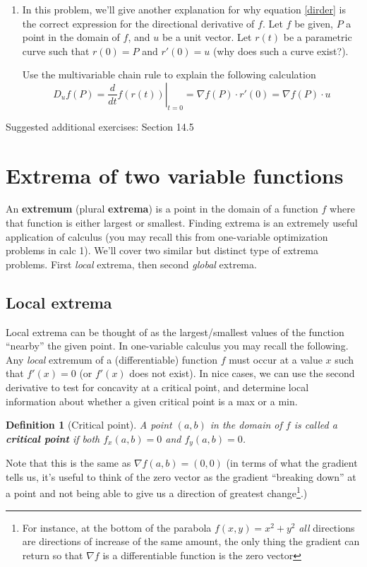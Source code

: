 \documentclass[12pt]{article}
\numberwithin{equation}{subsection}
\numberwithin{figure}{subsection}
\newtheorem{defn}[subsection]{Definition}
\theoremstyle{note}
\begin{document}
{\begin{enumerate}[label=\arabic*.]
\item In this problem, we'll give another explanation for  why equation \eqref{dirder} is the correct expression for the directional derivative of $f$. Let $f$ be given, $P$ a point in the domain of $f$, and $u$ be a unit vector. Let $r(t)$ be a parametric curve such that $r(0)=P$ and $r'(0)=u$ (why does such a curve exist?). 

Use the multivariable chain rule to explain the following calculation \[ D_uf(P)=\left. \dfrac{d}{dt} f(r(t)) \right|_{t=0} = \nabla f(P)  \cdot r'(0)=\nabla f(P)\cdot u \]
\end{enumerate}

Suggested additional exercises: Section 14.5 





\section{Extrema of two variable functions}

An \textbf{extremum} (plural \textbf{extrema}) is a point in the domain of a function $f$ where that function is either largest or smallest. Finding extrema is an extremely useful application of calculus (you may recall this from one-variable optimization problems in calc 1). We'll cover two similar but distinct type of extrema problems. First \textit{local} extrema, then second \textit{global} extrema. 

\subsection{Local extrema}
Local extrema can be thought of as the largest/smallest values of the function ``nearby'' the given point. In one-variable calculus you may recall the following. Any \textit{local} extremum of a (differentiable) function $f$ must occur at a value $x$ such that $f'(x)=0$ (or $f'(x)$ does not exist). In nice cases, we can use the second derivative to test for concavity at a critical point, and determine local information about whether a given critical point is a max or a min.

\begin{defn}[Critical point] A point $(a,b)$ in the domain of $f$ is called a \textbf{critical point} if both $f_x(a,b)=0$ and $f_y(a,b)=0$. 
\end{defn}

Note that this is the same as $\nabla f(a,b)=(0,0)$ (in terms of what the gradient tells us, it's useful to think of the zero vector as the gradient ``breaking down'' at a point and not being able to give us a direction of greatest change\footnote{For instance, at the bottom of the parabola $f(x,y)=x^2+y^2$ \textit{all} directions are directions of increase of the same amount, the only thing the gradient can return so that $\nabla f$ is a differentiable function is the zero vector}.) 

}
\end{document}
